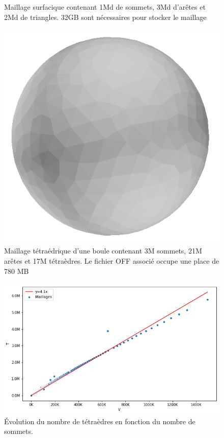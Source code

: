 \documentclass[9pt]{beamer}
\begin{document}
\begin{frame}
\begin{columns}[c]
\begin{column}[c]{.37\textwidth}
\begin{figure}
\caption{Maillage surfacique contenant 1Md de sommets, 3Md d'arêtes et 2Md de triangles. 32GB sont nécessaires pour stocker le maillage}
\vspace{-1em}
    \end{figure}
     \begin{figure}
    \includegraphics[scale=0.07]{../Images/ball}
\caption{Maillage tétraédrique d'une boule contenant 3M sommets, 21M arêtes et 17M tétraèdres. Le fichier OFF associé occupe une place de 780 MB}
\vspace{-1em}
    \end{figure}
     \begin{figure}
    \includegraphics[scale=0.19]{../Images/T_V_3D}
\caption{\'{E}volution du nombre de tétraèdres en fonction du nombre de sommets.}
    \end{figure}
    \end{column}%
  \end{columns}


\end{frame}
\end{document}
